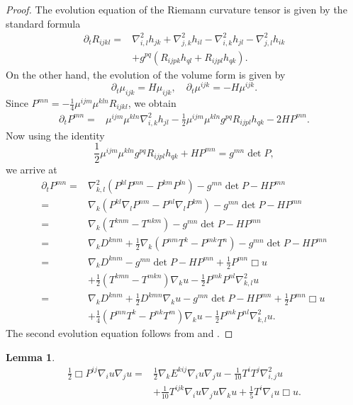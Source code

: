 \documentclass{amsart}
\newtheorem{lemma}[theorem]{Lemma}
\theoremstyle{definition}
\theoremstyle{remark}
\numberwithin{equation}{section}
\begin{document}
\begin{proof}
The evolution equation of the Riemann curvature tensor is given by the standard formula
\begin{align*}
\partial_t R_{ijkl}=&\nabla^2_{i,l}h_{jk}+\nabla^2_{j,k}h_{il}-\nabla^2_{i,k}h_{jl}-\nabla^2_{j,l}h_{ik}\\
&+g^{pq}(R_{ijpk}h_{ql}+R_{ijpl}h_{qk}).
\end{align*}
On the other hand, the evolution of the volume form is given by $$\partial_t\mu_{ijk}=H\mu_{ijk},\quad\partial_t\mu^{ijk}=-H\mu^{ijk}.$$
Since $P^{mn}=-\frac{1}{4}\mu^{ijm}\mu^{kln}R_{ijkl}$, we obtain
\begin{align*}
\partial_tP^{mn}=&\mu^{ijm}\mu^{kln}\nabla^2_{i,k}h_{jl}-\frac{1}{2}\mu^{ijm}\mu^{kln}g^{pq}R_{ijpl}h_{qk}-2HP^{mn}.
\end{align*}
Now using the identity
\[\frac{1}{2}\mu^{ijm}\mu^{kln}g^{pq}R_{ijpl}h_{qk}+HP^{mn}=g^{mn}\det P,\]
we arrive at
\begin{align*}
\partial_tP^{mn}=&\nabla^2_{k,l}(P^{kl}P^{mn}-P^{km}P^{ln})-g^{mn}\det P-HP^{mn}\\
=&\nabla_k(P^{kl}\nabla_lP^{nm}-P^{nl}\nabla_lP^{km})-g^{mn}\det P-HP^{mn}\\
=&\nabla_k\left(T^{knm}-T^{nkm}\right)-g^{mn}\det P-HP^{mn}\\
=&\nabla_kD^{knm}+\frac{1}{2}\nabla_k\left(P^{nm}T^k-P^{mk}T^n\right)-g^{mn}\det P-HP^{mn}\\
=&\nabla_kD^{knm}-g^{mn}\det P-HP^{mn}+\frac{1}{2}P^{mn}\Box u\\
&+\frac{1}{2}\left(T^{kmn}-T^{mkn}\right)\nabla_ku-\frac{1}{2}P^{mk}P^{nl}\nabla^2_{k,l}u\\
=&\nabla_kD^{knm}+\frac{1}{2}D^{kmn}\nabla_ku-g^{mn}\det P-HP^{mn}+\frac{1}{2}P^{mn}\Box u\\
&+\frac{1}{4}\left(P^{mn}T^k-P^{nk}T^m\right)\nabla_ku-\frac{1}{2}P^{mk}P^{nl}\nabla^2_{k,l}u.
\end{align*}
The second evolution equation follows from \cite[Prop. 9]{Chowcross2002} and  \cite[Equ. (4)]{Chowcross2002}.
\end{proof}
\begin{lemma}
\begin{align*}
\frac{1}{2}\Box P^{ij}\nabla_iu\nabla_ju=&\frac{1}{2}\nabla_k E^{kij}\nabla_iu\nabla_ju-\frac{1}{10}T^iT^j\nabla^2_{i,j}u\\
&+\frac{1}{10}T^{ijk}\nabla_iu\nabla_ju\nabla_ku+\frac{1}{5}T^{i}\nabla_iu\Box u.
\end{align*}
\end{lemma}
\end{document}
